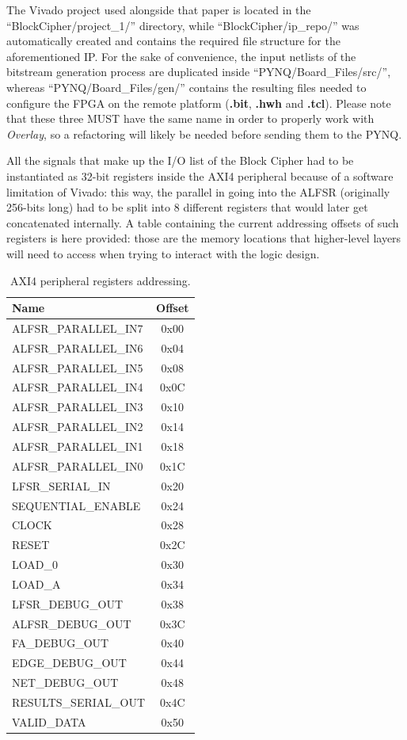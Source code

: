 The Vivado project used alongside that paper is located in the ``BlockCipher/project\_1/'' directory, while ``BlockCipher/ip\_repo/'' was automatically created and contains the required file structure for the aforementioned IP.
For the sake of convenience, the input netlists of the bitstream generation process are duplicated inside ``PYNQ/Board\_Files/src/'', whereas ``PYNQ/Board\_Files/gen/'' contains the resulting files needed to configure the FPGA on the remote platform (\textbf{.bit}, \textbf{.hwh} and \textbf{.tcl}).
Please note that these three MUST have the same name in order to properly work with \emph{Overlay}, so a refactoring will likely be needed before sending them to the PYNQ.

All the signals that make up the I/O list of the Block Cipher had to be instantiated as 32-bit registers inside the AXI4 peripheral because of a software limitation of Vivado: this way, the parallel in going into the ALFSR (originally 256-bits long) had to be split into 8 different registers that would later get concatenated internally.
A table containing the current addressing offsets of such registers is here provided: those are the memory locations that higher-level layers will need to access when trying to interact with the logic design.
\begin{table}
\centering
\begin{tabular}{| l | c |}
        \hline
        \textbf{Name} & \textbf{Offset}\\ \hline
        \hline
        ALFSR\_PARALLEL\_IN7 & 0x00\\ \hline
        ALFSR\_PARALLEL\_IN6 & 0x04\\ \hline
        ALFSR\_PARALLEL\_IN5 & 0x08\\ \hline
        ALFSR\_PARALLEL\_IN4 & 0x0C\\ \hline
        ALFSR\_PARALLEL\_IN3 & 0x10\\ \hline
        ALFSR\_PARALLEL\_IN2 & 0x14\\ \hline
        ALFSR\_PARALLEL\_IN1 & 0x18\\ \hline
        ALFSR\_PARALLEL\_IN0 & 0x1C\\ \hline
        LFSR\_SERIAL\_IN & 0x20\\ \hline
        SEQUENTIAL\_ENABLE & 0x24\\ \hline
        CLOCK & 0x28\\ \hline
        RESET & 0x2C\\ \hline
        LOAD\_0 & 0x30\\ \hline
        LOAD\_A & 0x34\\ \hline
        LFSR\_DEBUG\_OUT & 0x38\\ \hline
        ALFSR\_DEBUG\_OUT & 0x3C\\ \hline
        FA\_DEBUG\_OUT & 0x40\\ \hline
        EDGE\_DEBUG\_OUT & 0x44\\ \hline
        NET\_DEBUG\_OUT & 0x48\\ \hline
        RESULTS\_SERIAL\_OUT & 0x4C\\ \hline
        VALID\_DATA & 0x50\\ \hline
\end{tabular}
\caption{AXI4 peripheral registers addressing.}
\end{table}
